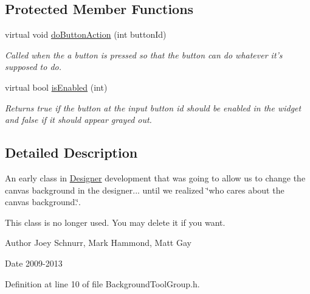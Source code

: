 \subsection*{Protected Member Functions}
\begin{DoxyCompactItemize}
\item 
\hypertarget{class_background_tool_group_a4bd76e6ee62d01a9da923038dd5dd96b}{virtual void \hyperlink{class_background_tool_group_a4bd76e6ee62d01a9da923038dd5dd96b}{do\-Button\-Action} (int button\-Id)}\label{class_background_tool_group_a4bd76e6ee62d01a9da923038dd5dd96b}

\begin{DoxyCompactList}\small\item\em Called when the a button is pressed so that the button can do whatever it's supposed to do. \end{DoxyCompactList}\item 
virtual bool \hyperlink{class_background_tool_group_ae1f380cbc416556ae99a0a16a524d39c}{is\-Enabled} (int)
\begin{DoxyCompactList}\small\item\em Returns true if the button at the input button id should be enabled in the widget and false if it should appear grayed out. \end{DoxyCompactList}\end{DoxyCompactItemize}


\subsection{Detailed Description}
An early class in \hyperlink{class_designer}{Designer} development that was going to allow us to change the canvas background in the designer... until we realized \char`\"{}who cares about the canvas background.\char`\"{}. 

This class is no longer used. You may delete it if you want. \begin{DoxyAuthor}{Author}
Joey Schnurr, Mark Hammond, Matt Gay 
\end{DoxyAuthor}
\begin{DoxyDate}{Date}
2009-\/2013 
\end{DoxyDate}


Definition at line 10 of file Background\-Tool\-Group.\-h.



